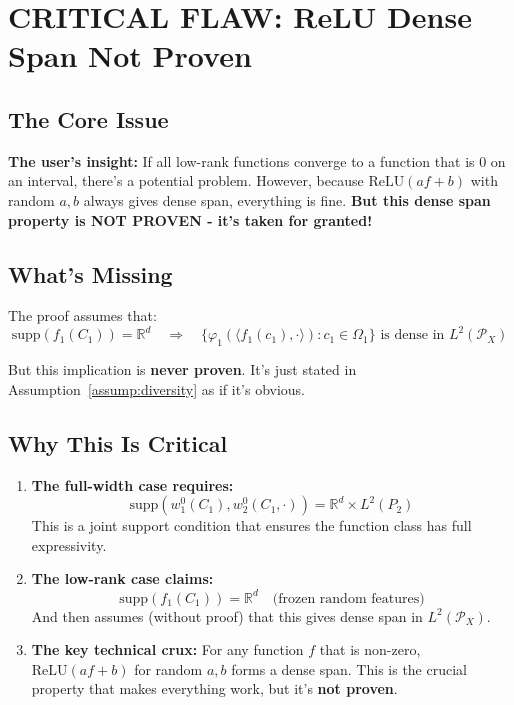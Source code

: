 \section{CRITICAL FLAW: ReLU Dense Span Not Proven}
\label{sec:relu-dense-span-flaw}

\subsection{The Core Issue}

\textbf{The user's insight:} If all low-rank functions converge to a function that is 0 on an interval, there's a potential problem. However, because $\text{ReLU}(af+b)$ with random $a,b$ always gives dense span, everything is fine. \textbf{But this dense span property is NOT PROVEN - it's taken for granted!}

\subsection{What's Missing}

The proof assumes that:
\[
\text{supp}(f_1(C_1)) = \mathbb{R}^d \quad \Rightarrow \quad \{\varphi_1(\langle f_1(c_1), \cdot\rangle) : c_1 \in \Omega_1\} \text{ is dense in } L^2(\mathcal{P}_X)
\]

But this implication is \textbf{never proven}. It's just stated in Assumption~\ref{assump:diversity} as if it's obvious.

\subsection{Why This Is Critical}

\begin{enumerate}
\item \textbf{The full-width case requires:}
\[
\text{supp}(w_1^0(C_1), w_2^0(C_1, \cdot)) = \mathbb{R}^d \times L^2(P_2)
\]
This is a joint support condition that ensures the function class has full expressivity.

\item \textbf{The low-rank case claims:}
\[
\text{supp}(f_1(C_1)) = \mathbb{R}^d \quad \text{(frozen random features)}
\]
And then assumes (without proof) that this gives dense span in $L^2(\mathcal{P}_X)$.

\item \textbf{The key technical crux:} For any function $f$ that is non-zero, $\text{ReLU}(af+b)$ for random $a,b$ forms a dense span. This is the crucial property that makes everything work, but it's \textbf{not proven}.
\end{enumerate}

